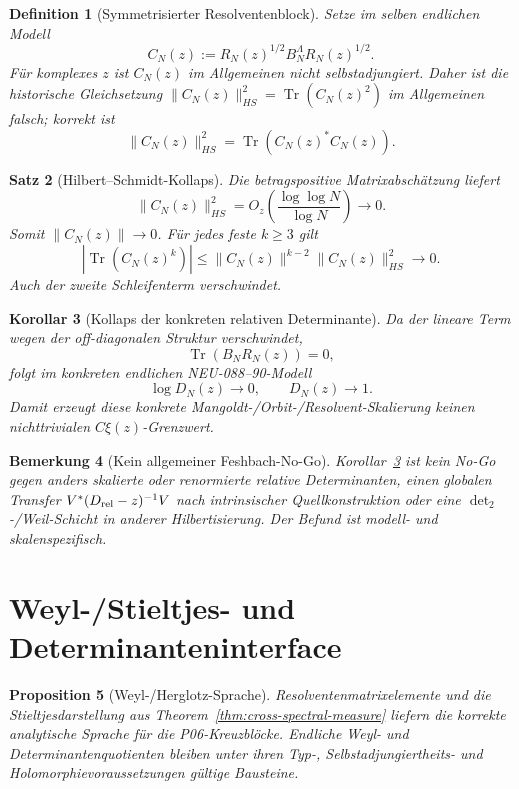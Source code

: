 \documentclass[11pt,a4paper]{amsart}
\newtheorem{theorem}{Satz}[section]
\newtheorem{proposition}[theorem]{Proposition}
\newtheorem{corollary}[theorem]{Korollar}
\newtheorem{definition}[theorem]{Definition}
\newtheorem{remark}[theorem]{Bemerkung}
\begin{document}
\begin{definition}[Symmetrisierter Resolventenblock]\label{def:Cn}
Setze im selben endlichen Modell
\[
C_N(z):=R_N(z)^{1/2}B_N^\Lambda R_N(z)^{1/2}.
\]
Für komplexes $z$ ist $C_N(z)$ im Allgemeinen nicht selbstadjungiert. Daher
ist die historische Gleichsetzung
$\|C_N(z)\|_{HS}^2=\operatorname{Tr}(C_N(z)^2)$ im Allgemeinen falsch;
korrekt ist
\[
\boxed{\|C_N(z)\|_{HS}^2=\operatorname{Tr}(C_N(z)^*C_N(z)).}
\]
\end{definition}

\begin{theorem}[Hilbert--Schmidt-Kollaps]\label{thm:HS-collapse}
Die betragspositive Matrixabschätzung liefert
\[
\boxed{\|C_N(z)\|_{HS}^2
=O_z\!\left(\frac{\log\log N}{\log N}\right)\longrightarrow0.}
\]
Somit $\|C_N(z)\|\to0$. Für jedes feste $k\ge3$ gilt
\[
|\operatorname{Tr}(C_N(z)^k)|
\le \|C_N(z)\|^{k-2}\|C_N(z)\|_{HS}^2\longrightarrow0.
\]
Auch der zweite Schleifenterm verschwindet.
\end{theorem}

\begin{corollary}[Kollaps der konkreten relativen Determinante]\label{cor:det-collapse}
Da der lineare Term wegen der off-diagonalen Struktur verschwindet,
\[
\operatorname{Tr}(B_NR_N(z))=0,
\]
folgt im konkreten endlichen NEU-088--90-Modell
\[
\boxed{\log D_N(z)\to0,\qquad D_N(z)\to1.}
\]
Damit erzeugt diese konkrete Mangoldt-/Orbit-/Resolvent-Skalierung keinen
nichttrivialen $C\xi(z)$-Grenzwert.
\end{corollary}

\begin{remark}[Kein allgemeiner Feshbach-No-Go]
Korollar~\ref{cor:det-collapse} ist kein No-Go gegen anders skalierte oder
renormierte relative Determinanten, einen globalen Transfer
$V^*(D_{\rm rel}-z)^{-1}V$ nach intrinsischer Quellkonstruktion oder eine
$\det_2$-/Weil-Schicht in anderer Hilbertisierung. Der Befund ist modell- und
skalenspezifisch.
\end{remark}

\section{Weyl-/Stieltjes- und Determinanteninterface}

\begin{proposition}[Weyl-/Herglotz-Sprache]\label{prop:weyl}
Resolventenmatrixelemente und die Stieltjesdarstellung aus
Theorem~\ref{thm:cross-spectral-measure} liefern die korrekte analytische
Sprache für die P06-Kreuzblöcke. Endliche Weyl- und Determinantenquotienten
bleiben unter ihren Typ-, Selbstadjungiertheits- und Holomorphievoraussetzungen
gültige Bausteine.
\end{proposition}
\end{document}
